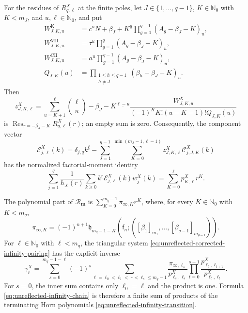 \documentclass[10pt]{amsart}
\newcommand{\Nzero}{\mathbb N_0}
\newcommand{\mm}{\boldsymbol m}
\newcommand{\fall}[2]{#1^{\underline{#2}}}
\DeclareMathOperator*{\Res}{Res}
\theoremstyle{plain}
\theoremstyle{definition}
\theoremstyle{remark}
\begin{document}
For the residues of \(R_{q,\ell}^X\) at the finite poles, let
\(J\in\{1,\ldots,q-1\}\), \(K\in\Nzero\) with \(K<m_J\), and
\(u,\ell\in\Nzero\), and put
\begin{align*}
 W_{J,K,u}^{\mathrm K}
 &=c^u\fall{N+\beta_J+K}{u}
   \prod_{g=1}^{q-1}(A_g-\beta_J-K)_u,\\
 W_{J,K,u}^{\mathrm{MII}}
 &=\tau^u\prod_{g=1}^{q}(A_g-\beta_J-K)_u,\\
 W_{J,K,u}^{\mathrm{CII}}
 &=a^u\prod_{g=1}^{q-1}(A_g-\beta_J-K)_u,\\
 Q_{J,K}(u)
 &=\prod_{\substack{1\le h\le q-1\\h\ne J}}
   (\beta_h-\beta_J-K)_u.
\end{align*}
Then
\begin{equation}
 z_{J,K,\ell}^X=
 \sum_{u=K+1}^{\ell}\binom\ell u
 \fall{-\beta_J-K}{\ell-u}
 \frac{W_{J,K,u}^X}
 {(-1)^K K!(u-K-1)!Q_{J,K}(u)}
 \label{eq:unreflected-base-residue}
\end{equation}
is \(\Res_{r=-\beta_J-K}R_{q,\ell}^X(r)\); an empty sum is zero.
Consequently, the component vector
\begin{equation}
 \mathcal E_{j,\ell}^X(k)
 =\delta_{j,q}\fall{k}{\ell}
 -\sum_{J=1}^{q-1}\sum_{K=0}^{\min(m_J-1,\ell-1)}
 z_{J,K,\ell}^X\mathcal C_{j,J,K}^X(k)
 \label{eq:unreflected-corrected-infinity-vector}
\end{equation}
has the normalized factorial-moment identity
\begin{equation}
 \sum_{j=1}^q\frac1{h_X(r)}
 \sum_{k\ge0}\fall{k}{r}\mathcal E_{j,\ell}^X(k)w_j^X(k)
 =\sum_{K=0}^{\ell}p_{K,\ell}^Xr^K.
 \label{eq:unreflected-corrected-infinity-pairing}
\end{equation}

The polynomial part of \(\mathcal R_{\mm}\) is
\(\sum_{K=0}^{m_q-1}\pi_{\infty,K}r^K\), where, for every
\(K\in\Nzero\) with \(K<m_q\),
\begin{equation}
 \pi_{\infty,K}=(-1)^{n+1}
 \mathfrak h_{m_q-1-K}
 \left(\mathsf f_n;
 ([\beta_1]_{m_1},\ldots,[\beta_{q-1}]_{m_{q-1}})\right).
 \label{eq:unreflected-target-infinity-coefficients}
\end{equation}
For \(\ell\in\Nzero\) with \(\ell<m_q\), the triangular system
\eqref{eq:unreflected-corrected-infinity-pairing} has the explicit inverse
\begin{equation}
 \gamma_\ell^X=
 \sum_{s=0}^{m_q-1-\ell}(-1)^s
 \sum_{\ell=\ell_0<\ell_1<\cdots<\ell_s\le m_q-1}
 \frac{\pi_{\infty,\ell_s}}{p_{\ell_s,\ell_s}^X}
 \prod_{t=0}^{s-1}
 \frac{p_{\ell_t,\ell_{t+1}}^X}
      {p_{\ell_t,\ell_t}^X}.
 \label{eq:unreflected-infinity-chain}
\end{equation}
For \(s=0\), the inner sum contains only \(\ell_0=\ell\) and the product is
one.  Formula \eqref{eq:unreflected-infinity-chain} is therefore a finite
sum of products of the terminating Horn polynomials
\eqref{eq:unreflected-infinity-transition}.
\end{document}
